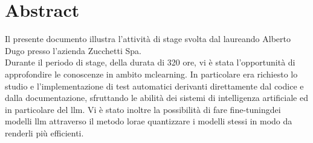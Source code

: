 \cleardoublepage
{}
{}
\begingroup
\let\clearpage\relax
\let\cleardoublepage\relax
\chapter*{Abstract}
Il presente documento illustra l'attività di stage svolta dal laureando Alberto Dugo presso l'azienda Zucchetti Spa.
\\Durante il periodo di stage, della durata di 320 ore, vi è stata l'opportunità di approfondire le conoscenze in ambito \gls{mclearning}\glox.
In particolare era richiesto lo studio e l'implementazione di test automatici derivanti direttamente dal codice e dalla documentazione, sfruttando le abilità dei sistemi di intelligenza artificiale ed in particolare del \gls{llm}\glox\gloxspacing.
Vi è stato inoltre la possibilità di fare \gls{fine-tuning}\glox dei modelli \gls{llm} attraverso il metodo \gls{lora}\glox e quantizzare i modelli stessi in modo da renderli più efficienti.
\endgroup
\vfill
